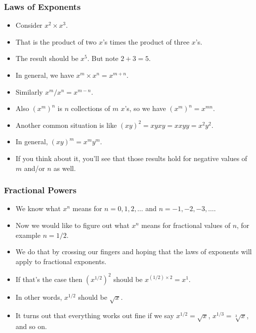 \documentclass[serif,ignorenonframetext]{beamer}
\begin{document}
\begin{frame}
  \frametitle{Laws of Exponents}
  \begin{itemize}[<+->]
  \item Consider $x^2 \times x^3$.  
  \item That is the product of two $x$'s times the product of three
    $x$'s.
  \item The result should be $x^5$.  But note $2+3=5$.
  \item In general, we have $x^m \times x^n=x^{m+n}$.
  \item Similarly $x^m/x^n=x^{m-n}$.
  \item Also $(x^m)^n$ is $n$ collections of $m$ $x$'s, so we have
    $(x^m)^n = x^{mn}$.
  \item Another common situation is like $(xy)^2=xyxy=xxyy=x^2y^2$.
  \item In general, $(xy)^m = x^my^m$.
  \item If you think about it, you'll see that those results hold for
    negative values of $m$ and/or $n$ as well.
  \end{itemize}
\end{frame}

\begin{frame}
  \frametitle{Fractional Powers}
  \begin{itemize}[<+->]
  \item We know what $x^n$ means for $n=0,1,2,\ldots$ and
    $n=-1,-2,-3,\ldots$.
  \item Now we would like to figure out what $x^n$ means for
    fractional values of $n$, for example $n=1/2$.
  \item We do that by crossing our fingers and hoping that the laws of
    exponents will apply to fractional exponents.
  \item If that's the case then $(x^{1/2})^2$ should be
    $x^{(1/2)\times 2} = x^1$.
  \item In other words, $x^{1/2}$ should be $\sqrt{x}$.
  \item It turns out that everything works out fine if we say
    $x^{1/2}=\sqrt{x}$, $x^{1/3}=\sqrt[3]{x}$, and so on.
  \end{itemize}
\end{frame}
\end{document}
